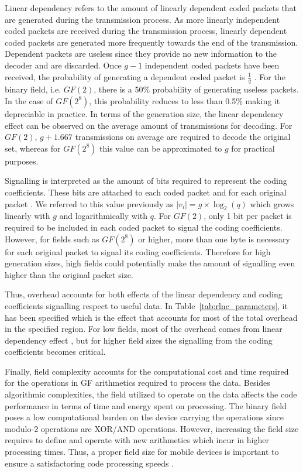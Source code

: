 Linear dependency refers to the amount of linearly dependent coded packets that are generated during the transmission process. As more linearly independent coded packets are received during the transmission process, linearly dependent coded packets are generated more frequently towards the end of the transmission. Dependent packets are useless since they provide no new information to the decoder and are discarded. Once $g - 1$ independent coded packets have been received, the probability of generating a dependent coded packet is $\frac{1}{q}$ \cite{lucani2009random,trullols2011exact,zhao2012notes}. For the binary field, i.e. $GF(2)$, there is a 50\% probability of generating useless packets. In the case of $GF(2^8)$, this probability reduces to less than 0.5\% making it depreciable in practice. In terms of the generation size, the linear dependency effect can be observed on the average amount of transmissions for decoding. For $GF(2)$, $g + 1.667$ transmissions on average are required to decode the original set, whereas for $GF(2^8)$ this value can be approximated to $g$ for practical purposes.

Signalling is interpreted as the amount of bits required to represent the coding coefficients. These bits are attached to each coded packet and for each original packet \cite{heide2011code}. We referred to this value previously as $|v_{i}| = g \times \log_{2}(q)$ which grows linearly with $g$ and logarithmically with $q$. For $GF(2)$, only 1 bit per packet is required to be included in each coded packet to signal the coding coefficients. However, for fields such as $GF(2^8)$ or higher, more than one byte is necessary for each original packet to signal its coding coefficients. Therefore for high generation sizes, high fields could potentially make the amount of signalling even higher than the original packet size.

Thus, overhead accounts for both effects of the linear dependency and coding coefficients signalling respect to useful data. In Table~\ref{tab:rlnc_parameters}, it has been specified which is the effect that accounts for most of the total overhead in the specified region. For low fields, most of the overhead comes from linear dependency effect , but for higher field sizes the signalling from the coding coefficients becomes critical.

Finally, field complexity accounts for the computational cost and time required for the operations in \ac{GF} arithmetics required to process the data. Besides algorithmic complexities, the field utilized to operate on the data affects the code performance in terms of time and energy spent on processing. The binary field poses a low computational burden on the device carrying the operations since modulo-2 operations are XOR/AND operations. However, increasing the field size requires to define and operate with new arithmetics which incur in higher processing times. Thus, a proper field size for mobile devices is important to ensure a satisfactoring code processing speeds \cite{heide2009network,paramanathan2013lean}.

